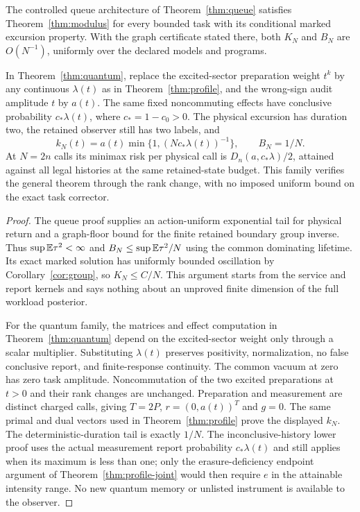 \begin{corollary}\label{cor:raw-modulus}
The controlled queue architecture of Theorem~\ref{thm:queue} satisfies Theorem~\ref{thm:modulus} for every bounded task with its conditional marked excursion property. With the graph certificate stated there, both $K_N$ and $B_N$ are $O(N^{-1})$, uniformly over the declared models and programs.

In Theorem~\ref{thm:quantum}, replace the excited-sector preparation weight $t^k$ by any continuous $\lambda(t)$ as in Theorem~\ref{thm:profile}, and the wrong-sign audit amplitude $t$ by $a(t)$. The same fixed noncommuting effects have conclusive probability $c_*\lambda(t)$, where $c_*=1-c_0>0$. The physical excursion has duration two, the retained observer still has two labels, and
\[
 k_N(t)=a(t)\min\{1,(Nc_*\lambda(t))^{-1}\},\qquad B_N=1/N.
\]
At $N=2n$ calls its minimax risk per physical call is $D_n(a,c_*\lambda)/2$, attained against all legal histories at the same retained-state budget. This family verifies the general theorem through the rank change, with no imposed uniform bound on the exact task corrector.
\end{corollary}
\begin{proof}
The queue proof supplies an action-uniform exponential tail for physical return and a graph-floor bound for the finite retained boundary group inverse. Thus $\sup\mathbb E\tau^2<\infty$ and $B_N\le\sup\mathbb E\tau^2/N$ using the common dominating lifetime. Its exact marked solution has uniformly bounded oscillation by Corollary~\ref{cor:group}, so $K_N\le C/N$. This argument starts from the service and report kernels and says nothing about an unproved finite dimension of the full workload posterior.

For the quantum family, the matrices and effect computation in Theorem~\ref{thm:quantum} depend on the excited-sector weight only through a scalar multiplier. Substituting $\lambda(t)$ preserves positivity, normalization, no false conclusive report, and finite-response continuity. The common vacuum at zero has zero task amplitude. Noncommutation of the two excited preparations at $t>0$ and their rank changes are unchanged. Preparation and measurement are distinct charged calls, giving $T=2P$, $r=(0,a(t))^T$ and $g=0$. The same primal and dual vectors used in Theorem~\ref{thm:profile} prove the displayed $k_N$. The deterministic-duration tail is exactly $1/N$. The inconclusive-history lower proof uses the actual measurement report probability $c_*\lambda(t)$ and still applies when its maximum is less than one; only the erasure-deficiency endpoint argument of Theorem~\ref{thm:profile-joint} would then require $e$ in the attainable intensity range. No new quantum memory or unlisted instrument is available to the observer.
\end{proof}


